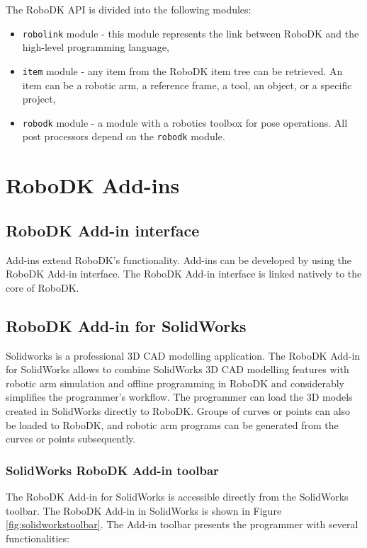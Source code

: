 The RoboDK API is divided into the following modules:


\begin{itemize}
    \item \texttt{robolink} module - this module represents the link between RoboDK and the high-level programming language,
    \item \texttt{item} module - any item from the RoboDK item tree can be retrieved.  An item can be a robotic arm, a reference frame, a tool, an object, or a specific project,
    \item \texttt{robodk} module - a module with a robotics toolbox for pose operations. All post processors depend on the \texttt{robodk} module.
\end{itemize}

\section{RoboDK Add-ins}

\subsection{RoboDK Add-in interface}

Add-ins extend RoboDK's functionality. Add-ins can be developed by using the RoboDK Add-in interface. The RoboDK Add-in interface is linked natively to the core of RoboDK.

\subsection{RoboDK Add-in for SolidWorks}

Solidworks is a professional 3D CAD modelling application. The RoboDK Add-in for SolidWorks allows to combine SolidWorks 3D CAD modelling features with robotic arm simulation and offline programming in RoboDK and considerably simplifies the programmer's workflow. The programmer can load the 3D models created in SolidWorks directly to RoboDK. Groups of curves or points can also be loaded to RoboDK, and robotic arm programs can be generated from the curves or points subsequently.

\subsubsection*{SolidWorks RoboDK Add-in toolbar}

The RoboDK Add-in for SolidWorks is accessible directly from the SolidWorks toolbar.  The RoboDK Add-in in SolidWorks is shown in Figure  \ref{fig:solidworkstoolbar}. The Add-in toolbar presents the programmer with several functionalities:

